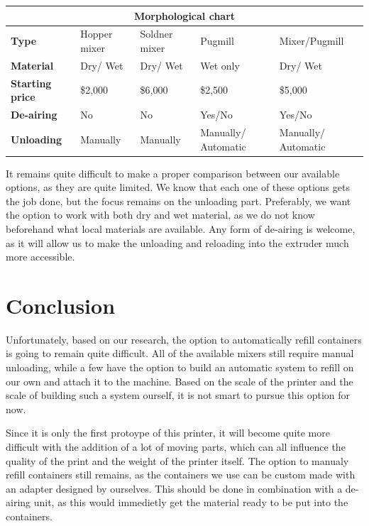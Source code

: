 \documentclass[12pt, a4paper]{article}
\begin{document}
	\begin{tabular}{ | p{3.2cm} || p{2cm} | p{2cm} | p{2cm}| p{2.6cm} | }
	\hline
	\multicolumn{5}{|c|}{\textbf{Morphological chart}} \\
	\hline
	\textbf{Type} & Hopper mixer& Soldner mixer & Pugmill & Mixer/Pugmill \\
	\hline
	\textbf{Material} & Dry/ Wet & Dry/ Wet & Wet only & Dry/ Wet \\
	\hline
	\textbf{Starting price} & \$2,000  & \$6,000 & \$2,500 & \$5,000  \\
	\hline
	\textbf{De-airing} & No & No & Yes/No & Yes/No \\
	\hline
	\textbf{Unloading} & Manually & Manually & Manually/ Automatic & Manually/ Automatic \\ 
	\hline
	\end{tabular}

It remains quite difficult to make a proper comparison between our available options, as they are quite limited. We know that each one of these options gets the job done, but the focus remains on the unloading part. Preferably, we want the option to work with both dry and wet material, as we do not know beforehand what local materials are available. Any form of de-airing is welcome, as it will allow us to make the unloading and reloading into the extruder much more accessible.
	\newpage

\section{Conclusion}
Unfortunately, based on our research, the option to automatically refill containers is going to remain quite difficult. All of the available mixers still require manual unloading, while a few have the option to build an automatic system to refill on our own and attach it to the machine. Based on the scale of the printer and the scale of building such a system ourself, it is not smart to pursue this option for now. 

Since it is only the first protoype of this printer, it will become quite more difficult with the addition of a lot of moving parts, which can all influence the quality of the print and the weight of the printer itself. The option to manualy refill containers still remains, as the containers we use can be custom made with an adapter designed by ourselves. This should be done in combination with a de-airing unit, as this would immedietly get the material ready to be put into the containers.
\end{document}
